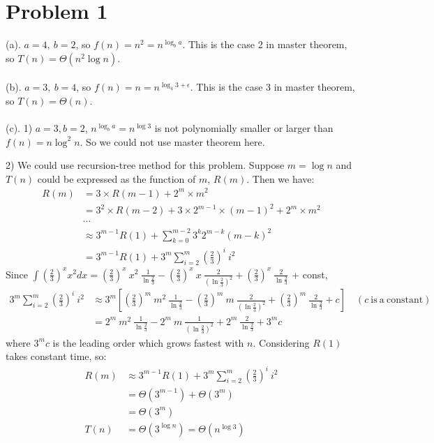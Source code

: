 \documentclass[twoside,11pt]{homework}
\begin{document}
\maketitle

\section*{Problem 1}
(a).
$a = 4,\ b = 2$, so $ f(n) = n^2 = n^{\log_b a}$.
This is the case 2 in master theorem, so $T(n) = \Theta (n^2 \log n)$.
\\\\
(b).
$a = 3,\ b = 4$, so $f(n) = n = n^{\log_4 3 + \epsilon}$.
This is the case 3 in master theorem, so $T(n) = \Theta (n)$.
\\\\
(c).
1) $a = 3, b = 2$, $ n^{\log_b a} = n^{\log 3}$ is not polynomially smaller or larger than $f(n) = n \log^2 n$. 
So we could not use master theorem here.

2) We could use recursion-tree method for this problem.
Suppose $m = \log n$ and $T(n)$ could be expressed as the function of $m$, $R(m)$.
Then we have:
%
\begin{equation}
\begin{split}
R(m) &= 3  \times R(m-1) + 2^m \times m^2 \\
         &= 3^2 \times R(m-2) + 3 \times 2^{m-1} \times (m-1)^2 + 2^m \times m^2 \\
         & \cdots \\
         &\approx 3^{m-1} R(1) + \sum_{k=0}^{m-2} 3^k 2^{m-k} (m-k)^2 \\
         &=3 ^{m-1} R(1) + 3^m \sum_{i=2}^m (\frac{2}{3})^i\ i^2
\end{split}
\end{equation}
%
Since $\int (\frac{2}{3})^x x^2 dx= (\frac{2}{3})^x\ x^2\ \frac{1}{\ln \frac{2}{3}} - (\frac{2}{3})^x\ x\  \frac{2}{(\ln \frac{2}{3})^2} +(\frac{2}{3})^x\ \frac{2}{\ln \frac{2}{3}} $ + const, 
%
\begin{equation}
\begin{split}
3^m \sum_{i=2}^m (\frac{2}{3})^i\ i^2 &\approx 3^m [(\frac{2}{3})^m\ m^2\ \frac{1}{\ln \frac{2}{3}} - (\frac{2}{3})^m\ m\  \frac{2}{(\ln \frac{2}{3})^2} +(\frac{2}{3})^m\ \frac{2}{\ln \frac{2}{3}} + c] \quad (c\ \mathrm{is\ a\ constant})\\
&= 2^m\ m^2\ \frac{1}{\ln \frac{2}{3}} - 2^m\ m\ \frac{1}{(\ln \frac{2}{3})^2} + 2^m\ \frac{2}{\ln \frac{2}{3}} + 3^m c 
\end{split}
\end{equation}
%
where $3^m c$ is the leading order which grows fastest with $n$. 
Considering $R(1)$ takes constant time, so:
%
\begin{equation}
\begin{split}
R(m) &\approx 3 ^{m-1} R(1) + 3^m \sum_{i=2}^m (\frac{2}{3})^i\ i^2 \\
         &= \Theta(3^{m-1}) + \Theta(3^m) \\
         &= \Theta(3^m) \\
T(n) &= \Theta(3^{\log n}) = \Theta(n^{\log 3}) 
\end{split}
\end{equation}
%
\end{document}
